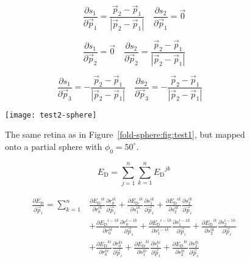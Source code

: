 \documentclass{article}
\newcommand{\ED}{\ensuremath{E_\mathrm{D}}\xspace}
\newcommand{\p}{\vec{p}}
\begin{document}
\begin{equation}
  \frac{\partial s_1}{\partial \p_1} = 
  \frac{\p_2 - \p_1}{|\p_2 - \p_1|} \quad
  \frac{\partial s_2}{\partial \p_1} = \vec{0}
\end{equation}

\begin{equation}
  \frac{\partial s_1}{\partial \p_2} = \vec{0} \quad
  \frac{\partial s_2}{\partial \p_2} =   \frac{\p_2 - \p_1}{|\p_2 - \p_1|} 
\end{equation}

\begin{equation}
  \frac{\partial s_1}{\partial \p_3} = 
  -\frac{\p_2 - \p_1}{|\p_2 - \p_1|} \quad
  \frac{\partial s_2}{\partial \p_3} = 
  -\frac{\p_2 - \p_1}{|\p_2 - \p_1|} \quad
\end{equation}


\begin{figure}
  \centering
  \texttt{[image: test2-sphere]}
  \caption{The same retina as in Figure~\ref{fold-sphere:fig:test1},
    but mapped onto a partial sphere with $\phi_0= 50^\circ$.}
  \label{fold-sphere:fig:test2}
\end{figure}

\begin{equation}
  \ED = \sum_{j=1}^n \sum_{k=1}^n \ED^{jk}
\end{equation}

\begin{equation}
  \begin{split}
  \frac{\partial \ED}{\partial \p_i} = 
  \sum_{k=1}^n & 
  \frac{\partial \ED^{ik}}{\partial r_0^{ik}}
  \frac{\partial r_0^{ik}}{\partial \p_i} +
  \frac{\partial \ED^{ik}}{\partial s_1^{ik}}
  \frac{\partial s_1^{ik}}{\partial \p_i} +
  \frac{\partial \ED^{ik}}{\partial s_2^{ik}}
  \frac{\partial s_2^{ik}}{\partial \p_i} \\
  &   
  + \frac{\partial \ED^{i-1k}}{\partial r_0^{ik}}
  \frac{\partial r_0^{i-1k}}{\partial \p_i} +
  \frac{\partial \ED^{i-1k}}{\partial s_1^{i-1k}}
  \frac{\partial s_1^{i-1k}}{\partial \p_i} +
  \frac{\partial \ED^{ik}}{\partial s_2^{ik}}
  \frac{\partial s_2^{i-1k}}{\partial \p_i} \\
  & 
  + \frac{\partial \ED^{ki}}{\partial r_0^{ki}}
  \frac{\partial r_0^{ki}}{\partial \p_i} +
  \frac{\partial \ED^{ki}}{\partial s_1^{ki}}
  \frac{\partial s_1^{ki}}{\partial \p_i} +
  \frac{\partial \ED^{ki}}{\partial s_2^{ki}}
  \frac{\partial s_2^{ki}}{\partial \p_i} \\
  \end{split}
\end{equation}
\end{document}
